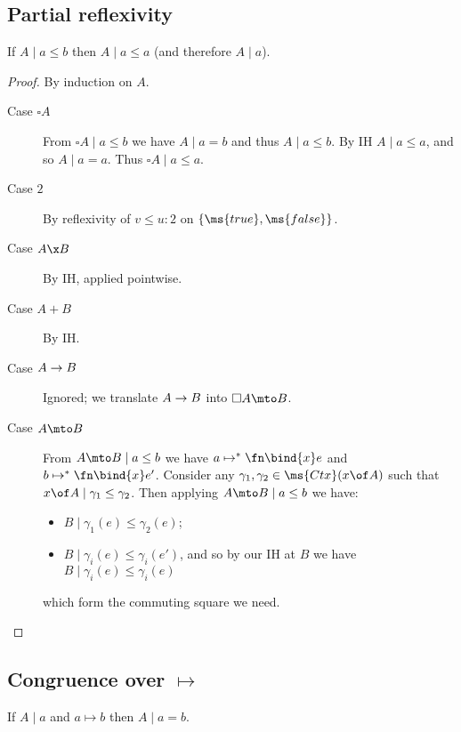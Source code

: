 \documentclass{article}
\newcommand{\step}{\mapsto}
\newcommand{\lr}[2]{#1\mathrel{|}#2}
\newcommand{\steps}{\step^*}
\newcommand{\disc}[1]{\square{#1}}
\begin{document}

\subsection{Partial reflexivity}
\begin{theorem}
  If $\lr{A}{a \le b}$ then $\lr{A}{a \le a}$ (and therefore $\lr{A}{a}$).
\end{theorem}

\begin{proof}
  By induction on $A$.
  \begin{description}
  \item[Case $\disc{A}$] From $\lr{\disc{A}}{a \le b}$ we have $\lr{A}{a = b}$
    and thus $\lr{A}{a \le b}$. By IH $\lr{A}{a \le a}$, and so $\lr{A}{a = a}$.
    Thus $\lr{\disc{A}}{a \le a}$.
  \item[Case $2$] By reflexivity of $v \le u : 2$ on $\{\ms{true},\ms{false}\}$.
  \item[Case $A \x B$] By IH, applied pointwise. 
  \item[Case $A + B$] By IH. 
  \item[Case $A \to B$] Ignored; we translate $A \to B$ into $\disc{A} \mto B$.
  \item[Case $A \mto B$] From $\lr{A \mto B}{a \le b}$ we have $a \steps
    \fn\bind{x} e$ and $b \steps \fn\bind{x} e'$. Consider any $\gamma_1,
    \gamma_2 \in \ms{Ctx}(x \of A)$ such that $\lr{x\of A}{\gamma_1 \le
      \gamma_2}$. Then applying $\lr{A \mto B}{a \le b}$ we have:
    \begin{itemize}
    \item $\lr{B}{\gamma_1(e) \le \gamma_2(e)}$;
    \item $\lr{B}{\gamma_i(e) \le \gamma_i(e')}$, and so by our IH at $B$ we
      have $\lr{B}{\gamma_i(e) \le \gamma_i(e)}$
    \end{itemize}
    which form the commuting square we need.

  \end{description}
\end{proof}


\subsection{Congruence over $\step$}

\begin{theorem}
  If $\lr{A}{a}$ and $a \step b$ then $\lr{A}{a = b}$.
\end{theorem}
\end{document}
